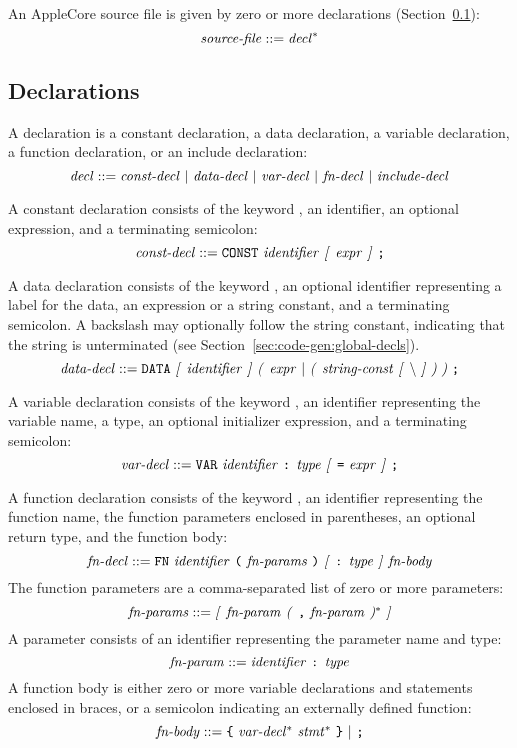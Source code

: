 \documentclass[10pt]{article}
\begin{document}
An AppleCore source file is given by zero or more
declarations (Section~\ref{sec:syntax:decls}):
%
$$\mbox{\textit{source-file}} ::= \mbox{\textit{decl}}^*$$

\subsection{Declarations}
\label{sec:syntax:decls}

A declaration is a constant declaration, a data declaration, a
variable declaration, a function declaration, or an include
declaration:
%
$$\mbox{\textit{decl}} ::= \mbox{\ensuremath{\mbox{\textit{const-decl}}} $|$
  \ensuremath{\mbox{\textit{data-decl}}} $|$ \ensuremath{\mbox{\textit{var-decl}}} $|$ \ensuremath{\mbox{\textit{fn-decl}}}
    $|$ \ensuremath{\mbox{\textit{include-decl}}}}$$

 A constant declaration consists of the
keyword , an identifier, an optional expression, and a
terminating semicolon:
%
$$\mbox{\textit{const-decl}} ::= \mbox{\texttt{CONST} \ensuremath{\mbox{\textit{identifier}}}
  \textit{[} \ensuremath{\mbox{\textit{expr}}} \textit{]} \texttt{;}}$$

 A data declaration consists of the keyword
, an optional identifier representing a label for the data,
an expression or a string constant, and a terminating semicolon.  A
backslash may optionally follow the string constant, indicating that
the string is unterminated (see
Section~\ref{sec:code-gen:global-decls}).
%
$$\nonterm{data-decl} ::= \mbox{\kwd{DATA} \opt{\nonterm{identifier}}
  \group{\nonterm{expr} $|$ \group{\nonterm{string-const} \opt{\bs}}}
  \kwd{;}}$$

 A variable declaration consists of the
keyword , an identifier representing the variable name, a
type, an optional initializer expression, and a terminating semicolon:
%
$$\mbox{\textit{var-decl}} ::= \mbox{\texttt{VAR} \ensuremath{\mbox{\textit{identifier}}} \texttt{:}
  \ensuremath{\mbox{\textit{type}}} \textit{[} \texttt{=} \ensuremath{\mbox{\textit{expr}}} \textit{]} \texttt{;}}$$

 A function declaration consists of the
keyword , an identifier representing the function name, the
function parameters enclosed in parentheses, an optional return type,
and the function body:
%
$$\mbox{\textit{fn-decl}} ::= \mbox{\texttt{FN} \ensuremath{\mbox{\textit{identifier}}} \texttt{(}
  \ensuremath{\mbox{\textit{fn-params}}} \texttt{)} \textit{[} \texttt{:} \ensuremath{\mbox{\textit{type}}} \textit{]}
  \ensuremath{\mbox{\textit{fn-body}}}}$$
%
The function parameters are a comma-separated list of zero or more
parameters:
%
$$\mbox{\textit{fn-params}} ::= \mbox{\textit{[} \ensuremath{\mbox{\textit{fn-param}}} \textit{(} \texttt{,}
    \ensuremath{\mbox{\textit{fn-param}}} \textit{)}$^*$ \textit{]}}$$
%
A parameter consists of an identifier representing the parameter name
and type:
%
$$\mbox{\textit{fn-param}} ::= \mbox{\ensuremath{\mbox{\textit{identifier}}} \texttt{:}
  \ensuremath{\mbox{\textit{type}}}}$$
%
A function body is either zero or more variable declarations and
statements enclosed in braces, or a semicolon indicating an externally
defined function:
%
$$\mbox{\textit{fn-body}} ::= \mbox{\texttt{\{} \ensuremath{\mbox{\textit{var-decl}}}$^*$
  \ensuremath{\mbox{\textit{stmt}}}$^*$ \texttt{\}} $|$ \texttt{;}}$$
\end{document}

